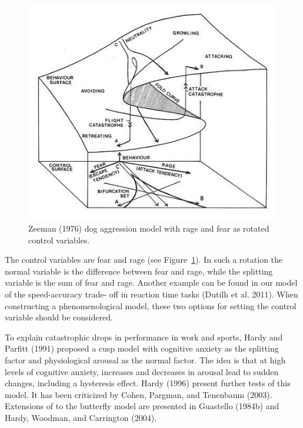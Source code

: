 \documentclass[
  a4paper,
  DIV=11,
  numbers=noendperiod]{scrreprt}
\begin{document}
\begin{figure}

{\centering \includegraphics{media/ch3/image17.jpg}

}

\caption{\label{fig-ch3-img17-old-29}Zeeman (1976) dog aggression model
with rage and fear as rotated control variables.}

\end{figure}

The control variables are fear and rage (see
Figure~\ref{fig-ch3-img17-old-29}). In such a rotation the normal
variable is the difference between fear and rage, while the splitting
variable is the sum of fear and rage. Another example can be found in
our model of the speed-accuracy trade- off in reaction time tasks
(Dutilh et al. 2011). When constructing a phenomenological model, these
two options for setting the control variable should be considered.

To explain catastrophic drops in performance in work and sports, Hardy
and Parfitt (1991) proposed a cusp model with cognitive anxiety as the
splitting factor and physiological arousal as the normal factor. The
idea is that at high levels of cognitive anxiety, increases and
decreases in arousal lead to sudden changes, including a hysteresis
effect. Hardy (1996) present further tests of this model. It has been
criticized by Cohen, Pargman, and Tenenbaum (2003). Extensions of to the
butterfly model are presented in Guastello (1984b) and Hardy, Woodman,
and Carrington (2004).
\end{document}
